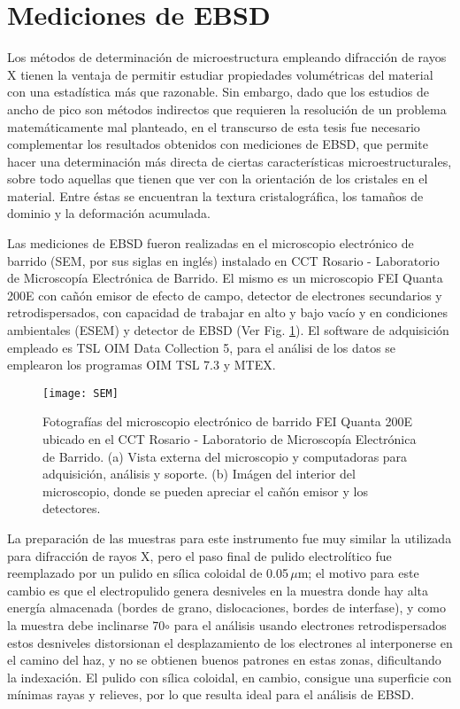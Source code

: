 \section{Mediciones de EBSD}\label{S:MatEBSD}
Los métodos de determinación de microestructura empleando difracción de rayos X tienen la ventaja de permitir estudiar propiedades volumétricas del material con una estadística más que razonable.
Sin embargo, dado que los estudios de ancho de pico son métodos indirectos que requieren la resolución de un problema matemáticamente mal planteado, en el transcurso de esta tesis fue necesario complementar los resultados obtenidos con mediciones de EBSD, que permite hacer una determinación más directa de ciertas características microestructurales, sobre todo aquellas que tienen que ver con la orientación de los cristales en el material.
Entre éstas se encuentran la textura cristalográfica, los tamaños de dominio y la deformación acumulada.

Las mediciones de EBSD fueron realizadas en el microscopio electrónico de barrido (SEM, por sus siglas en inglés) instalado en CCT Rosario - Laboratorio de Microscopía Electrónica de Barrido.
El mismo es un microscopio FEI Quanta 200E con cañón emisor de efecto de campo, detector de electrones secundarios y retrodispersados, con capacidad de trabajar en alto y bajo vacío y en condiciones ambientales (ESEM) y detector de EBSD (Ver Fig. \ref{fig:SEM}).
El software de adquisición empleado es TSL OIM Data Collection 5, para el análisi de los datos se emplearon los programas OIM TSL 7.3 y MTEX.

\begin{figure}[!htb]
  \centering
  \texttt{[image: SEM]}
  \caption{Fotografías del microscopio electrónico de barrido FEI Quanta 200E ubicado en el CCT Rosario - Laboratorio de Microscopía Electrónica de Barrido. (a) Vista externa del microscopio y computadoras para adquisición, análisis y soporte. (b) Imágen del interior del microscopio, donde se pueden apreciar el cañón emisor y los detectores.}
  \label{fig:SEM}
\end{figure}

La preparación de las muestras para este instrumento fue muy similar la utilizada para difracción de rayos X, pero el paso final de pulido electrolítico fue reemplazado por un pulido en sílica coloidal de 0.05\,$\mu$m; el motivo para este cambio es que el electropulido genera desniveles en la muestra donde hay alta energía almacenada (bordes de grano, dislocaciones, bordes de interfase), y como la muestra debe inclinarse 70$\circ$ para el análisis usando electrones retrodispersados estos desniveles distorsionan el desplazamiento de los electrones al interponerse en el camino del haz, y no se obtienen buenos patrones en estas zonas, dificultando la indexación.
El pulido con sílica coloidal, en cambio, consigue una superficie con mínimas rayas y relieves, por lo que resulta ideal para el análisis de EBSD.

